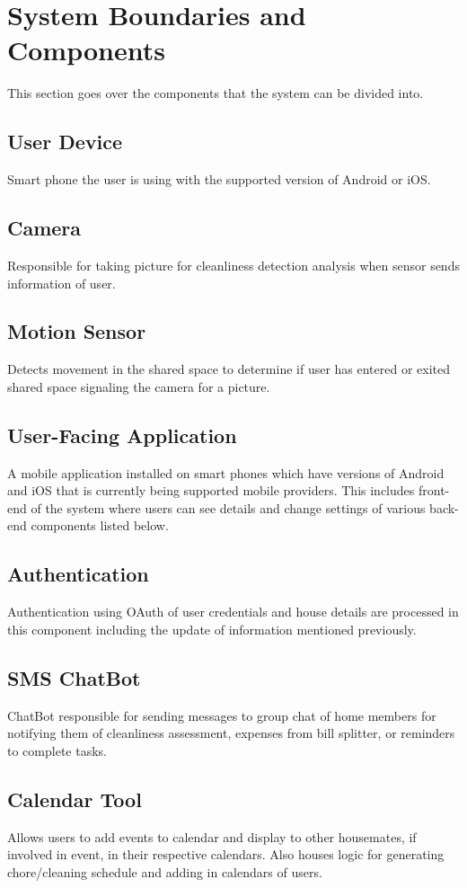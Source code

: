 \documentclass{article}
\begin{document}
\section{System Boundaries and Components}
This section goes over the components that the system can be divided into.

\subsection{User Device}
Smart phone the user is using with the supported version of Android or iOS.

\subsection{Camera}
Responsible for taking picture for cleanliness detection analysis when sensor sends information of user.

\subsection{Motion Sensor}
Detects movement in the shared space to determine if user has entered or exited shared space signaling the camera for a picture.

\subsection{User-Facing Application}
A mobile application installed on smart phones which have versions of Android and iOS that is currently being supported mobile providers. This includes front-end of the system where users can see details and change settings of various back-end components listed below.

\subsection{Authentication}
Authentication using OAuth of user credentials and house details are processed in this component including the update of information mentioned previously.

\subsection{SMS ChatBot}
ChatBot responsible for sending messages to group chat of home members for notifying them of cleanliness assessment, expenses from bill splitter, or reminders to complete tasks.

\subsection{Calendar Tool}
Allows users to add events to calendar and display to other housemates, if involved in event, in their respective calendars. Also houses logic for generating chore/cleaning schedule and adding in calendars of users.
\end{document}
